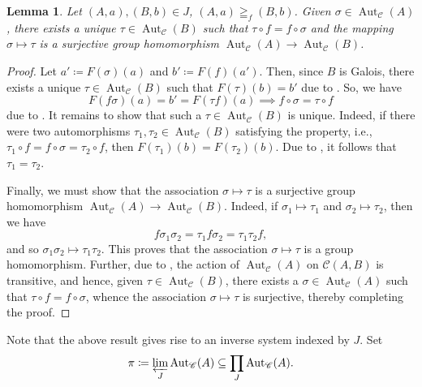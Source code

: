 \documentclass[10pt]{article}
\theoremstyle{thmstyle}
\newtheorem{lemma}[theorem]{Lemma}
\theoremstyle{defstyle}
\newcommand{\Aut}{\operatorname{Aut}}
\newcommand{\scrC}{\mathscr{C}} %
\begin{document}
\begin{lemma}
    Let $(A, a), (B, b)\in J$, $(A, a)\geqq_f (B, b)$. Given $\sigma\in\Aut_{\scrC}(A)$, there exists a unique $\tau\in\Aut_{\scrC}(B)$ such that $\tau\circ f = f\circ\sigma$ and the mapping $\sigma\mapsto\tau$ is a surjective group homomorphism $\Aut_{\scrC}(A)\to\Aut_{\scrC}(B)$.
\end{lemma}
\begin{proof}
    Let $a'\coloneq F(\sigma)(a)$ and $b'\coloneq F(f)(a')$. Then, since $B$ is Galois, there exists a unique $\tau\in\Aut_{\scrC}(B)$ such that $F(\tau)(b) = b'$ due to . So, we have 
    \begin{equation*}
        F(f\sigma)(a) = b' = F(\tau f)(a)\implies f\circ\sigma = \tau\circ f
    \end{equation*}
    due to . It remains to show that such a $\tau\in\Aut_{\scrC}(B)$ is unique. Indeed, if there were two automorphisms $\tau_1,\tau_2\in\Aut_{\scrC}(B)$ satisfying the property, i.e., $\tau_1\circ f = f\circ\sigma = \tau_2\circ f$, then $F(\tau_1)(b) = F(\tau_2)(b)$. Due to , it follows that $\tau_1 = \tau_2$. 

    Finally, we must show that the association $\sigma\mapsto\tau$ is a surjective group homomorphism $\Aut_{\scrC}(A)\to\Aut_{\scrC}(B)$. Indeed, if $\sigma_1\mapsto\tau_1$ and $\sigma_2\mapsto\tau_2$, then we have 
    \begin{equation*}
        f\sigma_1\sigma_2 = \tau_1 f\sigma_2 = \tau_1\tau_2 f,
    \end{equation*}
    and so $\sigma_1\sigma_2\mapsto\tau_1\tau_2$. This proves that the association $\sigma\mapsto\tau$ is a group homomorphism. Further, due to , the action of $\Aut_{\scrC}(A)$ on $\scrC(A, B)$ is transitive, and hence, given $\tau\in\Aut_{\scrC}(B)$, there exists a $\sigma\in\Aut_{\scrC}(A)$ such that $\tau\circ f = f\circ\sigma$, whence the association $\sigma\mapsto\tau$ is surjective, thereby completing the proof.
\end{proof}

Note that the above result gives rise to an inverse system indexed by $J$. Set 
\begin{equation*}
    \pi\coloneq\varprojlim_J\Aut_{\scrC}(A)\subseteq\prod_{J}\Aut_{\scrC}(A).
\end{equation*}
\end{document}
